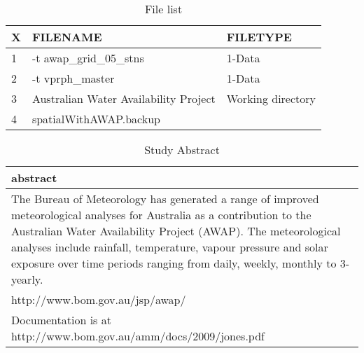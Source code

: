 \documentclass[a4paper]{article}
\begin{document}
\begin{table}[ht]
\begin{center}
\caption{File list}
\label{tab:tabx}
\begin{tabular}{p{.6cm}p{6cm}p{7cm}}
  \hline
X & FILENAME & FILETYPE \\ 
  \hline
1 & -t awap\_grid\_05\_stns & 1-Data \\ 
  2 & -t vprph\_master & 1-Data \\ 
  3 & Australian Water Availability Project & Working directory \\ 
  4 & spatialWithAWAP.backup &  \\ 
   \hline
\end{tabular}
\end{center}
\end{table}
\begin{table}[ht]
\begin{center}
\caption{Study Abstract}
\label{tab:tabx}
\begin{tabular}{p{13cm}}
  \hline
abstract \\ 
  \hline
The Bureau of Meteorology has generated a range of improved meteorological analyses for Australia as a contribution to the Australian Water Availability Project (AWAP). The meteorological analyses include rainfall, temperature, vapour pressure and solar exposure over time periods ranging from daily, weekly, monthly to 3-yearly. \\ 
  http://www.bom.gov.au/jsp/awap/ \\ 
  Documentation is at http://www.bom.gov.au/amm/docs/2009/jones.pdf \\ 
   \hline
\end{tabular}
\end{center}
\end{table}
\end{document}
